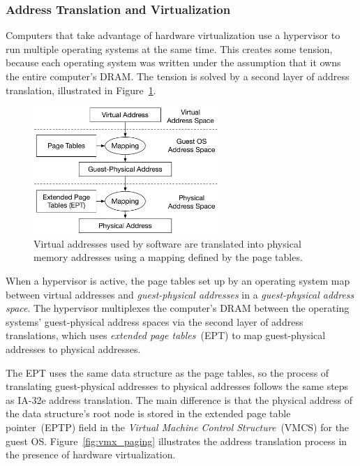\subsubsection{Address Translation and Virtualization}
\label{sec:vmx_paging}


Computers that take advantage of hardware virtualization use a hypervisor to
run multiple operating systems at the same time. This creates some tension,
because each operating system was written under the assumption that it owns the
entire computer's DRAM. The tension is solved by a second layer of address
translation, illustrated in Figure~\ref{fig:vmx_address_translation}.

\begin{figure}[hbt]
  \centering
  \includegraphics[width=70mm]{figures/vmx_address_translation.pdf}
  \caption{
    Virtual addresses used by software are translated into physical memory
    addresses using a mapping defined by the page tables.
  }
  \label{fig:vmx_address_translation}
\end{figure}


When a hypervisor is active, the page tables set up by an operating system map
between virtual addresses and \textit{guest-physical addresses} in a
\textit{guest-physical address space}. The hypervisor multiplexes the
computer's DRAM between the operating systems' guest-physical address spaces
via the second layer of address translations, which uses \textit{extended page
tables}~(EPT) to map guest-physical addresses to physical addresses.

The EPT uses the same data structure as the page tables, so the process of
translating guest-physical addresses to physical addresses follows the same
steps as IA-32e address translation. The main difference is that the physical
address of the data structure's root node is stored in the extended page table
pointer~(EPTP) field in the \textit{Virtual Machine Control Structure}~(VMCS)
for the guest OS. Figure~\ref{fig:vmx_paging} illustrates the address
translation process in the presence of hardware virtualization.

